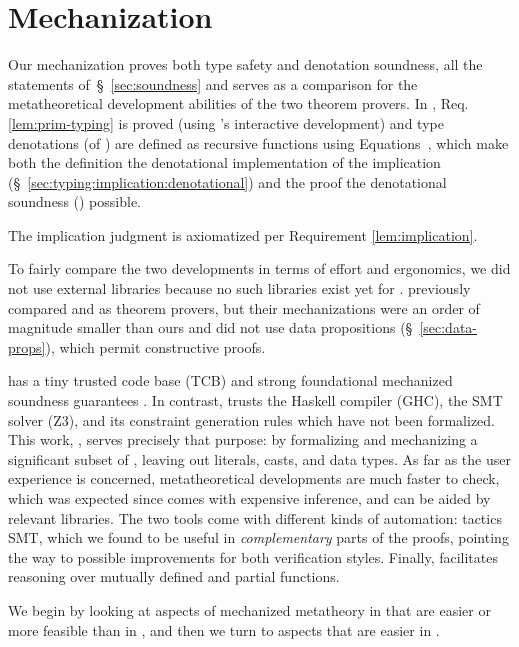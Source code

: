 \section{\coq Mechanization}
\label{sec:coq}

Our \coq mechanization 
proves both type safety and
denotation soundness, \ie all the statements of~\S~\ref{sec:soundness}
and serves as a comparison for the metatheoretical 
development abilities of the two theorem provers. 
%
%
In \coq, 
Req. \ref{lem:prim-typing} 
is proved (using \coq's interactive development)
and type denotations (of )
are defined as recursive functions using 
Equations~\cite{10.1145/3341690}, 
which make both the 
definition the denotational implementation
of the implication (\S~\ref{sec:typing:implication:denotational})
and the proof  
the denotational soundness ()
possible. 
\begin{fullversion}
    The implication judgment
    is  axiomatized per Requirement \ref{lem:implication}.
\end{fullversion}
%
To fairly compare the two developments
in terms of effort and ergonomics,
we did not use external \coq libraries 
because no such libraries exist yet for \lh.
%
\citet{Vazou17} previously compared \lh and \coq 
as theorem provers, but their mechanizations were an order of magnitude
smaller than ours and did not use data propositions (\S~\ref{sec:data-props}),
which permit constructive \lh proofs. 

\mypara{\coq \vs \lh}
\coq has a tiny trusted code base (TCB) 
and strong foundational mechanized soundness 
guarantees \cite{coqcoqcorrect}.
%
In contrast, \lh trusts the Haskell compiler (GHC), 
the SMT solver (Z3), and its constraint generation rules 
which have not been formalized. 
%
This work, \sysrf, serves precisely that purpose: by
formalizing and mechanizing a significant subset of \lh, 
leaving out literals, casts, and data types. 
%
As far as the user experience is concerned, 
\coq metatheoretical developments 
are much faster to check, which was 
expected since \lh comes with expensive 
inference, and can be aided by relevant libraries. 
The two tools come with different kinds of automation: 
tactics \vs SMT, which we found to be useful in \emph{complementary} 
parts of the proofs, pointing the way to possible improvements
for both verification styles.
Finally, \lh facilitates reasoning over 
mutually defined and partial functions. 
%
%
\begin{fullversion}
We begin by looking at aspects of mechanized metatheory in \coq
that are easier or more feasible than in \lh, and then we
turn to aspects that are easier in \lh.
\end{fullversion}

